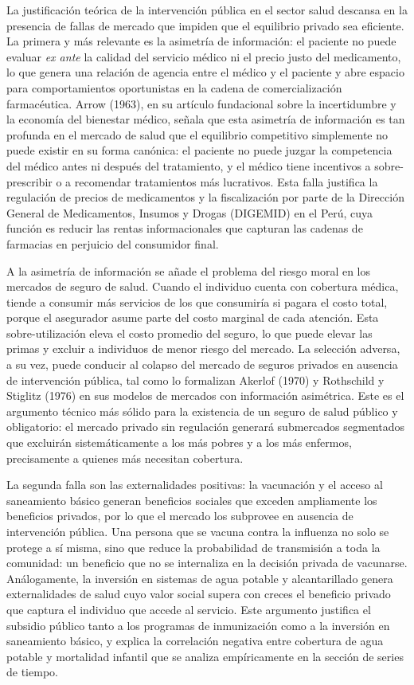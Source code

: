 \documentclass[12pt]{article}
\begin{document}
La justificación teórica de la intervención pública en el sector salud descansa en la presencia de
fallas de mercado que impiden que el equilibrio privado sea eficiente. La primera y más relevante es
la asimetría de información: el paciente no puede evaluar \textit{ex ante} la calidad del servicio
médico ni el precio justo del medicamento, lo que genera una relación de agencia entre el médico y
el paciente y abre espacio para comportamientos oportunistas en la cadena de comercialización
farmacéutica. Arrow (1963), en su artículo fundacional sobre la incertidumbre y la economía del
bienestar médico, señala que esta asimetría de información es tan profunda en el mercado de salud
que el equilibrio competitivo simplemente no puede existir en su forma canónica: el paciente no
puede juzgar la competencia del médico antes ni después del tratamiento, y el médico tiene
incentivos a sobre-prescribir o a recomendar tratamientos más lucrativos. Esta falla justifica la
regulación de precios de medicamentos y la fiscalización por parte de la Dirección General de
Medicamentos, Insumos y Drogas (DIGEMID) en el Perú, cuya función es reducir las rentas
informacionales que capturan las cadenas de farmacias en perjuicio del consumidor final.

A la asimetría de información se añade el problema del riesgo moral en los mercados de seguro de
salud. Cuando el individuo cuenta con cobertura médica, tiende a consumir más servicios de los que
consumiría si pagara el costo total, porque el asegurador asume parte del costo marginal de cada
atención. Esta sobre-utilización eleva el costo promedio del seguro, lo que puede elevar las primas
y excluir a individuos de menor riesgo del mercado. La selección adversa, a su vez, puede conducir
al colapso del mercado de seguros privados en ausencia de intervención pública, tal como lo
formalizan Akerlof (1970) y Rothschild y Stiglitz (1976) en sus modelos de mercados con
información asimétrica. Este es el argumento técnico más sólido para la existencia de un seguro de
salud público y obligatorio: el mercado privado sin regulación generará submercados segmentados
que excluirán sistemáticamente a los más pobres y a los más enfermos, precisamente a quienes más
necesitan cobertura.

La segunda falla son las externalidades positivas: la vacunación y el acceso al saneamiento básico
generan beneficios sociales que exceden ampliamente los beneficios privados, por lo que el mercado
los subprovee en ausencia de intervención pública. Una persona que se vacuna contra la influenza
no solo se protege a sí misma, sino que reduce la probabilidad de transmisión a toda la comunidad:
un beneficio que no se internaliza en la decisión privada de vacunarse. Análogamente, la inversión
en sistemas de agua potable y alcantarillado genera externalidades de salud cuyo valor social supera
con creces el beneficio privado que captura el individuo que accede al servicio. Este argumento
justifica el subsidio público tanto a los programas de inmunización como a la inversión en
saneamiento básico, y explica la correlación negativa entre cobertura de agua potable y mortalidad
infantil que se analiza empíricamente en la sección de series de tiempo.
\end{document}
